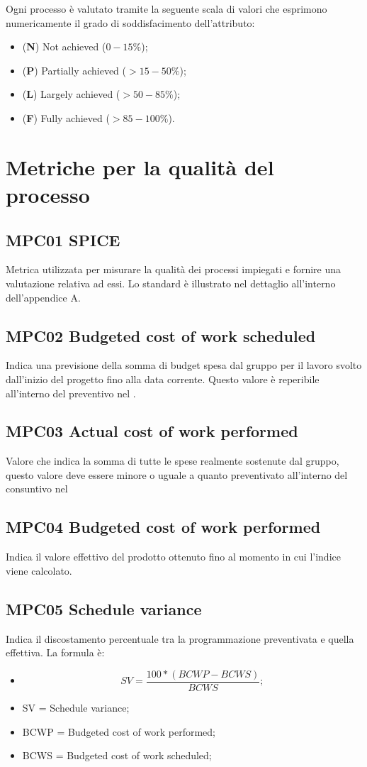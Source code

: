 Ogni processo è valutato tramite la seguente scala di valori che esprimono numericamente il grado di soddisfacimento dell’attributo:
\begin{itemize}
  \item (\textbf{N}) Not achieved (\(0-15\%\));
  \item (\textbf{P}) Partially achieved (\(>15-50\%\));
  \item (\textbf{L}) Largely achieved (\(>50-85\%\));
  \item (\textbf{F}) Fully achieved (\(>85-100\%\)). 
\end{itemize}

\pagebreak

\section{Metriche per la qualità del processo}
\subsection{MPC01 SPICE}
Metrica utilizzata per misurare la qualità dei processi impiegati e fornire una valutazione relativa ad essi. Lo standard è illustrato nel dettaglio all’interno dell'appendice A.

\subsection{MPC02 Budgeted cost of work scheduled}
Indica una previsione della somma di budget spesa dal gruppo per il lavoro svolto dall'inizio del progetto fino alla data corrente. Questo valore è reperibile all'interno del preventivo nel \PdP.

\subsection{MPC03 Actual cost of work performed}
Valore che indica la somma di tutte le spese realmente sostenute dal gruppo, questo valore deve essere minore o uguale a quanto preventivato all'interno del consuntivo nel \PdP

\subsection{MPC04 Budgeted cost of work performed}
Indica il valore effettivo del prodotto ottenuto fino al momento in cui l'indice viene calcolato.

\subsection{MPC05 Schedule variance}
Indica il discostamento percentuale tra la programmazione preventivata e quella effettiva.
La formula è:
\begin{itemize}
  \item[] \[SV =  \frac{100 * (BCWP - BCWS)}{BCWS};\]
  \item SV = Schedule variance;
  \item BCWP = Budgeted cost of work performed;
  \item BCWS = Budgeted cost of work scheduled;
\end{itemize}

